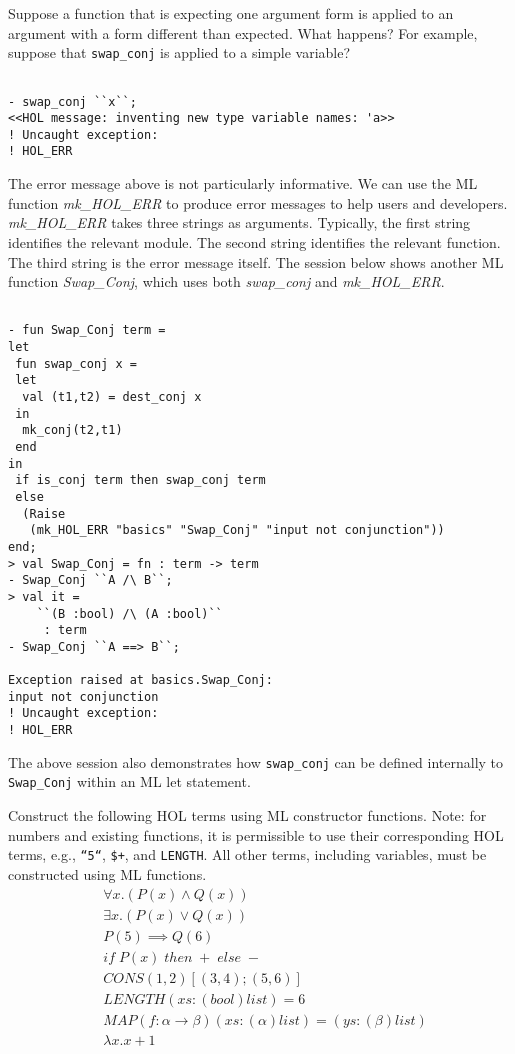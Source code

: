 Suppose a function that is expecting one argument form is applied to an
argument with a form different than expected. What happens? For
example, suppose that \small{\verb|swap_conj|} is applied to a simple
variable?
\begin{session}
\begin{verbatim}

- swap_conj ``x``;
<<HOL message: inventing new type variable names: 'a>>
! Uncaught exception: 
! HOL_ERR
\end{verbatim}
\end{session}
The error message above is not particularly informative. We can use
the ML function \emph{mk\_HOL\_ERR} to produce error messages to help
users and developers. \emph{mk\_HOL\_ERR} takes three strings as
arguments. Typically, the first string identifies the relevant module.
The second string identifies the relevant function. The third string
is the error message itself.  The session below shows another ML
function \emph{Swap\_Conj}, which uses both \emph{swap\_conj} and
\emph{mk\_HOL\_ERR}.
\begin{session}
\begin{verbatim}

- fun Swap_Conj term =
let
 fun swap_conj x =
 let
  val (t1,t2) = dest_conj x
 in
  mk_conj(t2,t1)
 end
in
 if is_conj term then swap_conj term
 else
  (Raise
   (mk_HOL_ERR "basics" "Swap_Conj" "input not conjunction"))
end;
> val Swap_Conj = fn : term -> term
- Swap_Conj ``A /\ B``;
> val it =
    ``(B :bool) /\ (A :bool)``
     : term
- Swap_Conj ``A ==> B``;

Exception raised at basics.Swap_Conj:
input not conjunction
! Uncaught exception: 
! HOL_ERR
\end{verbatim}
\end{session}

The above session also demonstrates how \small{\verb|swap_conj|} can
be defined internally to \small{\verb|Swap_Conj|} within an ML let
statement.

\begin{exercise}[\synthesis]
  Construct the following HOL terms using ML constructor
  functions. Note: for numbers and existing functions, it is
  permissible to use their corresponding HOL terms, e.g.,
  \texttt{``5``}, \texttt{\$+}, and \texttt{LENGTH}.  All other terms,
  including variables, must be constructed using ML functions.
      \begin{align*}
        & \forall x.(P(x) \wedge Q(x))\\
        & \exists x.(P(x) \vee Q(x))\\
        & P(5) \implies Q(6)\\
        & if \; P(x) \;then \;+ \;else \;-\\
        & CONS (1,2) [(3,4);(5,6)]\\
        & LENGTH (xs:(bool)list) = 6\\
        & MAP (f:\alpha \rightarrow \beta) (xs:(\alpha)list) =
        (ys:(\beta)list)\\
        & \lambda x.x+1\\
      \end{align*}
\end{exercise}


